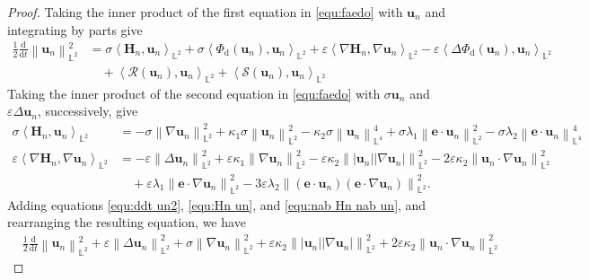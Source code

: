 \documentclass[11pt, reqno]{amsart}
\theoremstyle{definition}
\numberwithin{equation}{section}
\newcommand{\bff}{\boldsymbol}
\newcommand{\bb}{\mathbb}
\newcommand{\ddt}{\frac{\mathrm{d}}{\mathrm{d}t}}
\newcommand{\norm}[2]{\left\|{#1}\right\|_{#2}}
\newcommand{\inpro}[2]{\left\langle#1,#2\right\rangle}
\begin{document}
\begin{proof}
	Taking the inner product of the first equation in \eqref{equ:faedo} with $\bff{u}_n$ and integrating by parts give
	\begin{align}\label{equ:ddt un2}
		\nonumber
		\frac{1}{2} \ddt \norm{\bff{u}_n}{\bb{L}^2}^2
		&=
		\sigma \inpro{\bff{H}_n}{\bff{u}_n}_{\bb{L}^2}
		+
		\sigma \inpro{\Phi_{\mathrm{d}}(\bff{u}_n)}{\bff{u}_n}_{\bb{L}^2}
		+
		\varepsilon \inpro{\nabla \bff{H}_n}{\nabla \bff{u}_n}_{\bb{L}^2}
		-
		\varepsilon \inpro{\Delta \Phi_{\mathrm{d}}(\bff{u}_n)}{\bff{u}_n}_{\bb{L}^2}
		\\
		&\quad
		+
		\inpro{\mathcal{R}(\bff{u}_n)}{\bff{u}_n}_{\bb{L}^2}
		+
		\inpro{\mathcal{S}(\bff{u}_n)}{\bff{u}_n}_{\bb{L}^2}
	\end{align}
	Taking the inner product of the second equation in \eqref{equ:faedo}
	with $\sigma\bff{u}_n$ and $\varepsilon\Delta \bff{u}_n$, successively, give
	\begin{align}
		\label{equ:Hn un}
		\sigma \inpro{\bff{H}_n}{\bff{u}_n}_{\bb{L}^2}
		&=
		-
		\sigma \norm{\nabla \bff{u}_n}{\bb{L}^2}^2
		+
		\kappa_1 \sigma  \norm{\bff{u}_n}{\bb{L}^2}^2
		-
		\kappa_2 \sigma \norm{\bff{u}_n}{\bb{L}^4}^4
		+
		\sigma\lambda_1 \norm{\bff{e}\cdot \bff{u}_n}{\bb{L}^2}^2
		-
		\sigma\lambda_2 \norm{\bff{e}\cdot\bff{u}_n}{\bb{L}^4}^4
		\\
		\label{equ:nab Hn nab un}
		\varepsilon \inpro{\nabla \bff{H}_n}{\nabla \bff{u}_n}_{\bb{L}^2}
		&=
		-
		\varepsilon \norm{\Delta \bff{u}_n}{\bb{L}^2}^2
		+
		\varepsilon\kappa_1 \norm{\nabla \bff{u}_n}{\bb{L}^2}^2
		-
		\varepsilon\kappa_2 \norm{|\bff{u}_n| |\nabla \bff{u}_n|}{\bb{L}^2}^2
		-
		2\varepsilon \kappa_2 \norm{\bff{u}_n \cdot \nabla \bff{u}_n}{\bb{L}^2}^2
		\nonumber\\
		&\quad
		+
		\varepsilon\lambda_1 \norm{\bff{e}\cdot\nabla \bff{u}_n}{\bb{L}^2}^2
		-
		3\varepsilon\lambda_2 \norm{(\bff{e}\cdot \bff{u}_n)(\bff{e}\cdot \nabla \bff{u}_n)}{\bb{L}^2}^2.
	\end{align}
	 Adding equations \eqref{equ:ddt un2}, \eqref{equ:Hn un}, and \eqref{equ:nab Hn nab un}, and rearranging the resulting equation, we have
	\begin{align}\label{equ:ddt un lambda e Delta un}
		&\frac{1}{2} \ddt \norm{\bff{u}_n}{\bb{L}^2}^2
		+
		\varepsilon \norm{\Delta \bff{u}_n}{\bb{L}^2}^2
		+
		\sigma \norm{\nabla \bff{u}_n}{\bb{L}^2}^2
		+
		\varepsilon \kappa_2 \norm{|\bff{u}_n| |\nabla \bff{u}_n|}{\bb{L}^2}^2
		+
		2\varepsilon \kappa_2 \norm{\bff{u}_n \cdot \nabla \bff{u}_n}{\bb{L}^2}^2

\end{align}
\end{proof}
\end{document}
